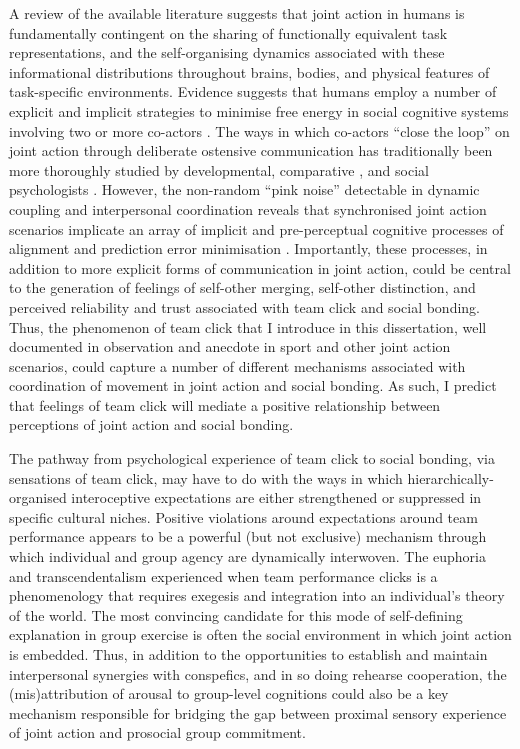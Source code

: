A review of the available literature suggests that joint action in humans is fundamentally contingent on the sharing of functionally equivalent task representations, and the self-organising dynamics associated with these informational distributions throughout brains, bodies, and physical features of task-specific environments.  Evidence suggests that humans employ a number of explicit and implicit strategies to minimise free energy in social cognitive systems involving two or more co-actors \citep{Semin2008,Frith2010}. The  ways in which co-actors ``close the loop'' \citep{Frith2007} on joint action through deliberate ostensive communication has traditionally been more thoroughly studied by developmental, comparative \cite{Tomasello2005a}, and social psychologists \citep{Sebanz2006}.
However, the non-random ``pink noise'' detectable in dynamic coupling and interpersonal coordination reveals that synchronised joint action scenarios implicate an array of implicit and pre-perceptual cognitive processes of alignment and prediction error minimisation \citep{Schmidt2011}. Importantly, these processes, in addition to more explicit forms of communication in joint action, could be central to the generation of feelings of self-other merging, self-other distinction, and perceived reliability and trust associated with team click and social bonding.  Thus, the phenomenon of team click that I introduce in this dissertation, well documented in observation and anecdote in sport and other joint action scenarios, could capture a number of different mechanisms associated with coordination of movement in joint action and social bonding.  As such, I predict that feelings of team click will mediate a positive relationship between perceptions of joint action and social bonding.

The pathway from psychological experience of team click to social bonding, via sensations of team click, may have to do with the ways in which hierarchically-organised interoceptive expectations are either strengthened or suppressed in specific cultural niches.  Positive violations around expectations around team performance appears to be a powerful (but not exclusive) mechanism through which individual and group agency are dynamically interwoven.
The euphoria and transcendentalism experienced when team performance clicks is a phenomenology that requires exegesis and integration into an individual's theory of the world.  The most convincing candidate for this mode of self-defining explanation in group exercise is often the social environment in which joint action is embedded.  Thus, in addition to the opportunities to establish and maintain interpersonal synergies with conspefics, and in so doing rehearse cooperation, the (mis)attribution of arousal \citep{Drachman1976} to group-level cognitions could also be a key mechanism responsible for bridging the gap between proximal sensory experience of joint action and prosocial group commitment.

